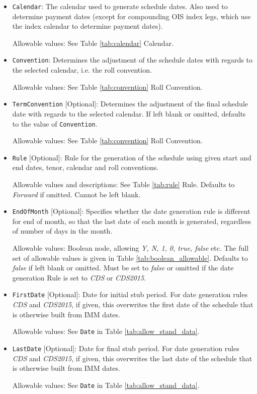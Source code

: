 \begin{itemize}
\item \lstinline!Calendar!: The calendar used to generate schedule  dates. Also used to determine payment dates (except for compounding OIS index legs, which use the index calendar to determine payment dates).

Allowable values: See Table \ref{tab:calendar} Calendar.

\item \lstinline!Convention!: Determines the adjustment of the schedule dates with
  regards to the selected calendar, i.e. the roll convention. 

Allowable values: See Table \ref{tab:convention} Roll Convention.

\item \lstinline!TermConvention! [Optional]: Determines the adjustment of the final schedule
  date with regards to the selected calendar. If left blank or omitted, defaults to the value of \lstinline!Convention!.

Allowable values: See Table \ref{tab:convention} Roll Convention.

\item \lstinline!Rule! [Optional]: Rule for the generation of the schedule using given
  start and end dates, tenor, calendar and roll conventions. 

Allowable values and descriptions: See Table \ref{tab:rule} Rule. Defaults to \emph{Forward} if omitted. Cannot be left blank.

\item \lstinline!EndOfMonth! [Optional]: Specifies whether the date generation rule is different for end of month, so that the last date of each month is generated, regardless of number of days in the month.

Allowable values: Boolean node, allowing \emph{Y, N, 1, 0, true, false} etc. The full set of allowable values is given in Table \ref{tab:boolean_allowable}. Defaults to \emph{false} if left blank or omitted. Must be set to \emph{false} or omitted if the date generation Rule is set to \emph{CDS} or \emph{CDS2015}.

\item \lstinline!FirstDate! [Optional]: Date for initial stub period. For date generation rules \emph{CDS} and \emph{CDS2015}, if given, this
  overwrites the first date of the schedule that is otherwise built from IMM dates.

Allowable values: See \lstinline!Date! in Table \ref{tab:allow_stand_data}.

\item \lstinline!LastDate! [Optional]: Date for final stub period. For date generation rules \emph{CDS} and \emph{CDS2015}, if given, this
  overwrites the last date of the schedule that is otherwise built from IMM dates.

Allowable values: See \lstinline!Date! in Table \ref{tab:allow_stand_data}.
\end{itemize}

